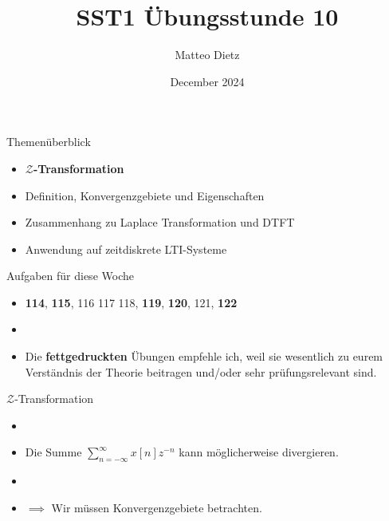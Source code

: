 \documentclass[14pt, aspectratio=169, handout]{beamer}
\title{SST1 Übungsstunde 10}
\author{Matteo Dietz}
\date{December 2024}
\begin{document}
\maketitle

\begin{frame}{Themenüberblick}
    \begin{itemize}
        \item \textbf{$\mathcal{Z}$-Transformation}
        \item[] Definition, Konvergenzgebiete und Eigenschaften
        \item[] Zusammenhang zu Laplace Transformation und DTFT
        \item[] Anwendung auf zeitdiskrete LTI-Systeme
    \end{itemize}
\end{frame}

\begin{frame}{Aufgaben für diese Woche}
    \begin{itemize}
        \item[] \textbf{114}, \textbf{115}, 116 117 118, \textbf{119}, \textbf{120}, 121, \textbf{122}
        \item[] 
        \item[] Die \textbf{fettgedruckten} Übungen empfehle ich, weil sie wesentlich zu eurem Verständnis der Theorie beitragen und/oder sehr prüfungsrelevant sind.
    \end{itemize}
\end{frame}

\begin{frame}
{$\mathcal{Z}$-Transformation}
\begin{itemize}
    \item[] 
    \item Die Summe $\sum_{n=-\infty}^\infty x[n]z^{-n}$ kann möglicherweise divergieren.
    \item[] 
    \item[] $\implies$ Wir müssen Konvergenzgebiete betrachten.
\end{itemize}

\end{frame}
\end{document}
